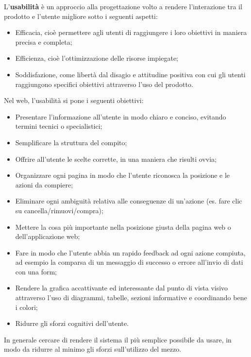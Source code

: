 L'\textbf{usabilità} è un approccio alla progettazione volto a rendere l'interazione tra il prodotto e l'utente migliore sotto i seguenti aspetti:
\begin{itemize}
    \item Efficacia, cioè permettere agli utenti di raggiungere i loro obiettivi in maniera precisa e completa;
    \item Efficienza, cioè l'ottimizzazione delle risorse impiegate;
    \item Soddisfazione, come libertà dal disagio e attitudine positiva con cui gli utenti raggiungono specifici obiettivi attraverso l’uso del prodotto.
\end{itemize}
Nel web, l'usabilità si pone i seguenti obiettivi:
\begin{itemize}
    \item Presentare l'informazione all'utente in modo chiaro e conciso, evitando termini tecnici o specialistici;
    \item Semplificare la struttura del compito;
    \item Offrire all'utente le scelte corrette, in una maniera che risulti ovvia;
    \item Organizzare ogni pagina in modo che l'utente riconosca la posizione e le azioni da compiere;
    \item Eliminare ogni ambiguità relativa alle conseguenze di un'azione (es. fare clic su cancella/rimuovi/compra);
    \item Mettere la cosa più importante nella posizione giusta della pagina web o dell'applicazione web;
    \item Fare in modo che l'utente abbia un rapido feedback ad ogni azione compiuta, ad esempio la comparsa di un messaggio di successo o errore all'invio di dati con una form;
    \item Rendere la grafica accattivante ed interessante dal punto di vista visivo attraverso l'uso di diagrammi, tabelle, sezioni informative e coordinando bene i colori;
    \item Ridurre gli sforzi cognitivi dell'utente.
\end{itemize}
In generale cercare di rendere il sistema il più semplice possibile da usare, in modo da ridurre al minimo gli sforzi sull'utilizzo del mezzo.

